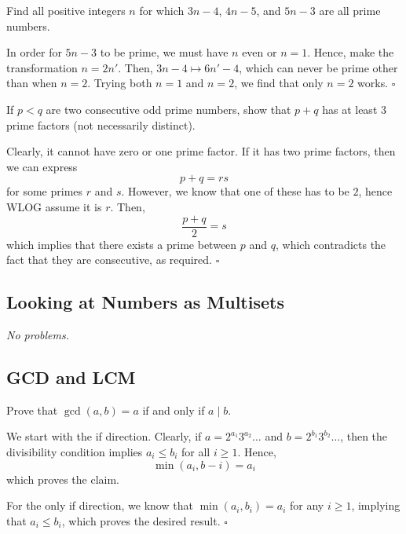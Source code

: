 \documentclass{article}
\begin{document}
\begin{problem}[1.4.1]{}
Find all positive integers $n$ for which $3n-4$, $4n-5$, and $5n-3$ are all prime numbers.
\end{problem}
In order for $5n-3$ to be prime, we must have $n$ even or $n = 1$. Hence, make the transformation $n = 2n'$. Then, $3n-4 \mapsto 6n'-4$, which can never be prime other than when $n = 2$. Trying both $n=1$ and $n=2$, we find that only $n = \boxed{2}$ works. $\square$

\begin{problem}[1.4.2]{}
If $p < q$ are two consecutive odd prime numbers, show that $p + q$ has at least $3$ prime factors (not necessarily distinct).
\end{problem}
Clearly, it cannot have zero or one prime factor. If it has two prime factors, then we can express \[p+q = rs\] for some primes $r$ and $s$. However, we know that one of these has to be $2$, hence WLOG assume it is $r$. Then, \[\dfrac{p+q}{2} = s\] which implies that there exists a prime between $p$ and $q$, which contradicts the fact that they are consecutive, as required. $\square$

\subsection{Looking at Numbers as Multisets}

\emph{No problems.}

\subsection{GCD and LCM}

\begin{problem}[1.6.1]{}
Prove that $\gcd(a, b) = a$ if and only if $a \mid b$.
\end{problem}
We start with the if direction. Clearly, if $a = 2^{a_1}3^{a_2}\dots$ and $b = 2^{b_1}3^{b_2}\dots$, then the divisibility condition implies $a_i \le b_i$ for all $i \ge 1$. Hence, \[\min(a_i, b-i) = a_i\] which proves the claim.

For the only if direction, we know that $\min(a_i, b_i) = a_i$ for any $i \ge 1$, implying that $a_i \le b_i$, which proves the desired result. $\square$
\end{document}
